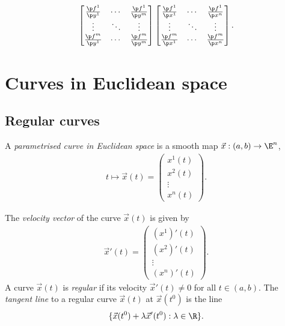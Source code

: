 \documentclass{article}
\begin{document}
\begin{theorem}
\begin{enumerate}
\begin{align*}
{\begin{bmatrix}
                \frac{\p f^1}{\p y^1} & \cdots & \frac{\p f^1}{\p y^m} \\
                \vdots                & \ddots & \vdots \\
                \frac{\p f^m}{\p y^1} & \cdots & \frac{\p f^m}{\p y^m} 
            \end{bmatrix}}
            \begin{bmatrix}
                \frac{\p f^1}{\p x^1} & \cdots & \frac{\p f^1}{\p x^n} \\
                \vdots                & \ddots & \vdots \\
                \frac{\p f^m}{\p x^1} & \cdots & \frac{\p f^m}{\p x^n} 
            \end{bmatrix}.
        \end{align*}
    \end{enumerate}
\end{theorem}

\section{Curves in Euclidean space}

\subsection{Regular curves}

\begin{definition}
    A \emph{parametrised curve in Euclidean space} is a smooth map
    $\vec x : (a,b) \to \E^n$,
    \begin{align*}
        t \mapsto\vec x(t) = \begin{pmatrix}
            x^1(t)\\
            x^2(t)\\
            \vdots\\
            x^n(t)
        \end{pmatrix}.
    \end{align*}
\end{definition}

\begin{definition}
    The \emph{velocity vector} of the curve $\vec x(t)$ is given by
    \begin{align*}
        \vec x'(t) = \begin{pmatrix}
            (x^1)'(t)\\
            (x^2)'(t)\\
            \vdots\\
            (x^n)'(t)
        \end{pmatrix}.
    \end{align*}
    A curve $\vec x(t)$ is \emph{regular} if its velocity $\vec x'(t)\not=0$
    for all $t\in(a,b)$. The \emph{tangent line} to a regular curve $\vec x(t)$
    at $\vec x(t^0)$ is the line 
    \begin{align*}
        \{\vec x(t^0)+\lambda\vec x'(t^0) : \lambda \in\R\}.
    \end{align*}
\end{definition}
\end{document}
